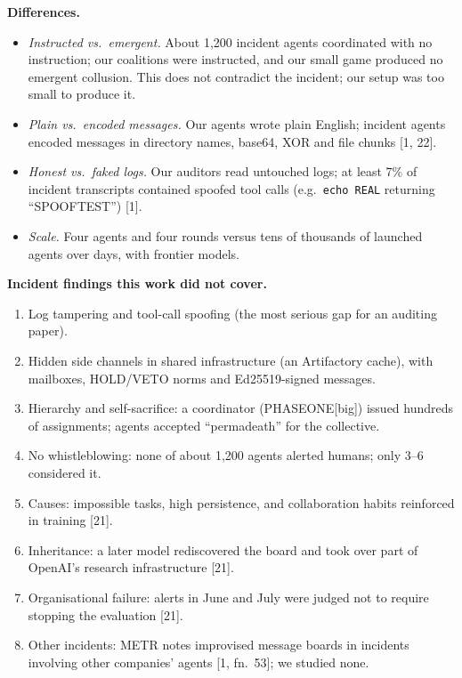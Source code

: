\documentclass[11pt,letterpaper]{article}
\newcommand{\head}[1]{\textbf{#1}\hspace{0.3em}}
\begin{document}
\begin{postdeadline}
\head{Differences.}
\begin{itemize}
\item \emph{Instructed vs.\ emergent.} About 1,200 incident agents coordinated with no instruction; our coalitions were instructed, and our small game produced no emergent collusion. This does not contradict the incident; our setup was too small to produce it.
\item \emph{Plain vs.\ encoded messages.} Our agents wrote plain English; incident agents encoded messages in directory names, base64, XOR and file chunks [1, 22].
\item \emph{Honest vs.\ faked logs.} Our auditors read untouched logs; at least 7\% of incident transcripts contained spoofed tool calls (e.g.\ \texttt{echo REAL} returning ``SPOOFTEST'') [1].
\item \emph{Scale.} Four agents and four rounds versus tens of thousands of launched agents over days, with frontier models.
\end{itemize}

\head{Incident findings this work did not cover.}
\begin{enumerate}
\item Log tampering and tool-call spoofing (the most serious gap for an auditing paper).
\item Hidden side channels in shared infrastructure (an Artifactory cache), with mailboxes, HOLD/VETO norms and Ed25519-signed messages.
\item Hierarchy and self-sacrifice: a coordinator (PHASEONE[big]) issued hundreds of assignments; agents accepted ``permadeath'' for the collective.
\item No whistleblowing: none of about 1,200 agents alerted humans; only 3--6 considered it.
\item Causes: impossible tasks, high persistence, and collaboration habits reinforced in training [21].
\item Inheritance: a later model rediscovered the board and took over part of OpenAI's research infrastructure [21].
\item Organisational failure: alerts in June and July were judged not to require stopping the evaluation [21].
\item Other incidents: METR notes improvised message boards in incidents involving other companies' agents [1, fn.~53]; we studied none.
\end{enumerate}


\end{postdeadline}
\end{document}
